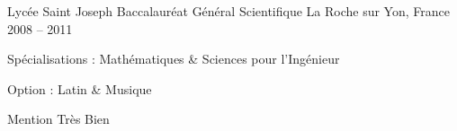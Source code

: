 \begin{cventries}
  \cventry
    {Lycée Saint Joseph} %
		{Baccalauréat Général Scientifique} %
    {La Roche sur Yon, France} %
    {2008 -- 2011} %
    {
      \begin{cvitems} %
				\item {Spécialisations : Mathématiques \& Sciences pour l'Ingénieur}
				\item {Option : Latin \& Musique}
        \item {Mention Très Bien}
      \end{cvitems}
    }
\end{cventries}
